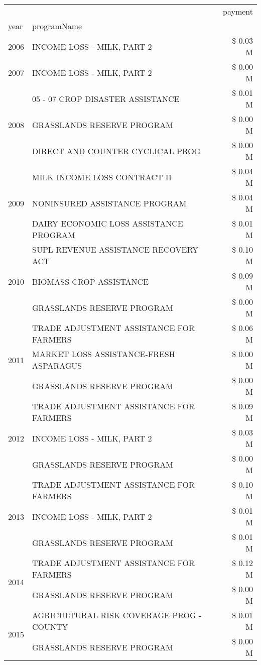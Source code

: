 \begin{tabular}{llr}
\toprule
 &  & payment \\
year & programName &  \\
\midrule
2006 & INCOME LOSS - MILK, PART 2 & \$ 0.03 M \\
\cline{1-3}
2007 & INCOME LOSS - MILK, PART 2 & \$ 0.00 M \\
\cline{1-3}
\multirow[t]{3}{*}{2008} & 05 - 07 CROP DISASTER ASSISTANCE & \$ 0.01 M \\
 & GRASSLANDS RESERVE PROGRAM & \$ 0.00 M \\
 & DIRECT AND COUNTER CYCLICAL PROG & \$ 0.00 M \\
\cline{1-3}
\multirow[t]{3}{*}{2009} & MILK INCOME LOSS CONTRACT II & \$ 0.04 M \\
 & NONINSURED ASSISTANCE PROGRAM & \$ 0.04 M \\
 & DAIRY ECONOMIC LOSS ASSISTANCE PROGRAM & \$ 0.01 M \\
\cline{1-3}
\multirow[t]{3}{*}{2010} & SUPL REVENUE ASSISTANCE RECOVERY ACT & \$ 0.10 M \\
 & BIOMASS CROP ASSISTANCE & \$ 0.09 M \\
 & GRASSLANDS RESERVE PROGRAM & \$ 0.00 M \\
\cline{1-3}
\multirow[t]{3}{*}{2011} & TRADE ADJUSTMENT ASSISTANCE FOR FARMERS & \$ 0.06 M \\
 & MARKET LOSS ASSISTANCE-FRESH ASPARAGUS & \$ 0.00 M \\
 & GRASSLANDS RESERVE PROGRAM & \$ 0.00 M \\
\cline{1-3}
\multirow[t]{3}{*}{2012} & TRADE ADJUSTMENT ASSISTANCE FOR FARMERS & \$ 0.09 M \\
 & INCOME LOSS - MILK, PART 2 & \$ 0.03 M \\
 & GRASSLANDS RESERVE PROGRAM & \$ 0.00 M \\
\cline{1-3}
\multirow[t]{3}{*}{2013} & TRADE ADJUSTMENT ASSISTANCE FOR FARMERS & \$ 0.10 M \\
 & INCOME LOSS - MILK, PART 2 & \$ 0.01 M \\
 & GRASSLANDS RESERVE PROGRAM & \$ 0.01 M \\
\cline{1-3}
\multirow[t]{2}{*}{2014} & TRADE ADJUSTMENT ASSISTANCE FOR FARMERS & \$ 0.12 M \\
 & GRASSLANDS RESERVE PROGRAM & \$ 0.00 M \\
\cline{1-3}
\multirow[t]{2}{*}{2015} & AGRICULTURAL RISK COVERAGE PROG - COUNTY & \$ 0.01 M \\
 & GRASSLANDS RESERVE PROGRAM & \$ 0.00 M \\

\end{tabular}
